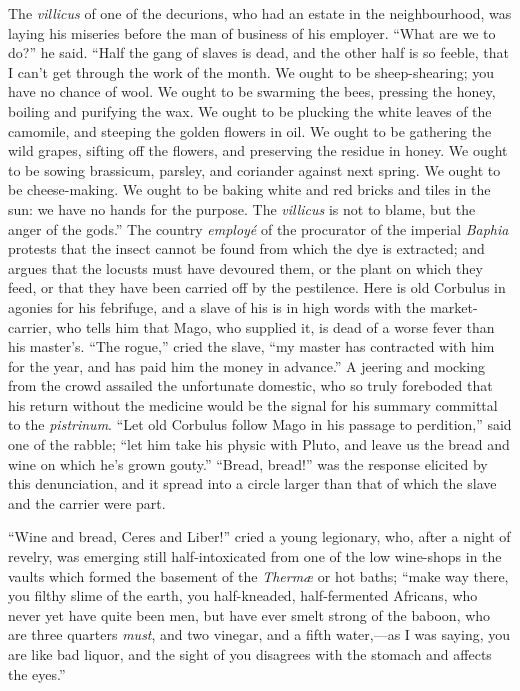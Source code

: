 The \emph{villicus} of one of the decurions, who had an estate in
the neighbourhood, was laying his miseries before the man of business
of his employer. ``What are we to do?'' he said. ``Half
the gang of slaves is dead, and the other half is so feeble,
that I can't get through the work of the month. We ought to be
sheep-shearing; you have no chance of wool. We ought to be swarming
the bees, pressing the honey, boiling and purifying the wax. We ought
to be plucking the white leaves of the camomile, and steeping the
golden flowers in oil. We ought to be gathering the wild grapes,
sifting off the flowers, and preserving the residue in honey. We ought
to be sowing brassicum, parsley, and coriander against next spring. We
ought to be cheese-making. We ought to be baking white and red bricks
and tiles in the sun: we have no hands for the purpose. The \emph{villicus}
is not to blame, but the anger of the gods.'' The country \emph{employé}
of the procurator of the imperial \emph{Baphia} protests that the
insect cannot be found from which the dye is extracted; and argues
that the locusts must have devoured them, or the plant on which they
feed, or that they have been carried off by the pestilence. Here is
old Corbulus in agonies for his febrifuge, and a slave of his is in
high words with the market-carrier, who tells him that Mago, who
supplied it, is dead of a worse fever than his master's. ``The
rogue,'' cried the slave, ``my master has contracted with him
for the year, and has paid him the money in advance.'' A jeering
and mocking from the crowd assailed the unfortunate domestic, who so
truly foreboded that his return without the medicine would be the
signal for his summary committal to the \emph{pistrinum}. ``Let
old Corbulus follow Mago in his passage to perdition,'' said
one of the rabble; ``let him take his physic with Pluto, and leave
us the bread and wine on which he's grown gouty.'' ``Bread,
bread!'' was the response elicited by this denunciation, and it
spread into a circle larger than that of which the slave and the
carrier were part.

``Wine and bread, Ceres and Liber!'' cried a young
legionary, who, after a night of revelry, was emerging still
half-intoxicated from one of the low wine-shops in the vaults which
formed the basement of the \emph{Thermæ} or hot baths; ``make way
there, you filthy slime of the earth, you half-kneaded, half-fermented
Africans, who never yet have quite been men, but have ever smelt
strong of the baboon, who are three quarters \emph{must}, and two
vinegar, and a fifth water,—as I was saying, you are like bad
liquor, and the sight of you disagrees with the stomach and affects
the eyes.''

